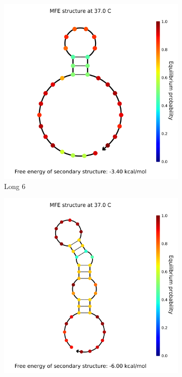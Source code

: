 \begin{figure}
\begin{subfigure}{.32\columnwidth}
  \centering
  \includegraphics[width=\linewidth]{images/long_rna_secondarystructure_6.png}
  \caption{Long 6}
\end{subfigure}%
\begin{subfigure}{.32\columnwidth}
  \centering
  \includegraphics[width=\linewidth]{images/long_rna_secondarystructure_7.png}

\end{subfigure}
\end{figure}
